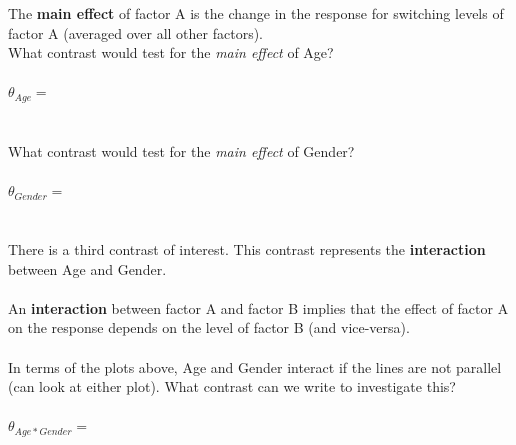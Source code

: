 The \textbf{main effect} of factor A is the change in the response for switching levels of factor A (averaged over all other factors).\\
What contrast would test for the \textit{main effect} of Age?\\~\\
$\theta_{Age} = $\\~\\~\\
What contrast would test for the \textit{main effect} of Gender?\\~\\
$\theta_{Gender} = $\\~\\~\\
There is a third contrast of interest.  This contrast represents the \textbf{interaction} between Age and Gender.\\~\\
An \textbf{interaction} between factor A and factor B implies that the effect of factor A on the response depends on the level of factor B (and vice-versa).\\~\\
In terms of the plots above, Age and Gender interact if the lines are not parallel (can look at either plot).  What contrast can we write to investigate this?\\~\\
$\theta_{Age*Gender} = $

\newpage

